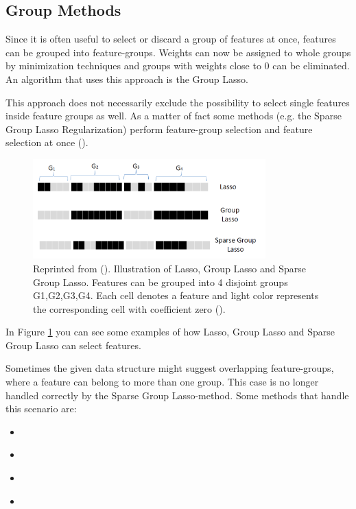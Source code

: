 \subsection{Group Methods}
\label{sec:methods.structured.group}

  
Since it is often useful to select or discard a group of features at once,
features can be grouped into feature-groups. Weights can now be assigned to
whole groups by minimization techniques and groups with weights close to $0$ can be
eliminated. An algorithm that uses this approach is the Group Lasso. 

This approach does not necessarily exclude the possibility to select single
features inside feature groups as well. As a matter of fact some methods
(e.g. the Sparse Group Lasso Regularization) perform feature-group selection and
feature selection at once (\cite{Tang:04}).

\begin{figure}[!ht]
  \centering 
  \includegraphics[width=0.8\textwidth]{chapters/methods/structured/group_lasso}
  \caption{Reprinted from (\cite{Tang:04}). Illustration of Lasso, Group Lasso
  and Sparse Group Lasso.
  Features can be grouped into 4 disjoint groups {G1,G2,G3,G4}. Each cell denotes a feature and light color
represents the corresponding cell with coefficient zero (\cite{Tang:04}).}
  \label{fig:methods.structured.group.lasso}
\end{figure}

In Figure \ref{fig:methods.structured.group.lasso} you can see some examples of
how Lasso, Group Lasso and Sparse Group Lasso can select features. 

Sometimes the given data structure might suggest overlapping feature-groups,
where a feature can belong to more than one group. This case is no longer
handled correctly by the Sparse Group Lasso-method. Some methods that handle
this scenario are:

\begin{itemize}
  \item \cite{Liu:10}
  \item \cite{Kim:10}
  \item \cite{Jenatton:10}
  \item \cite{Jacob:09}
\end{itemize}






